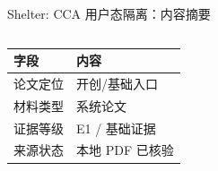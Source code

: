 \begin{frame}[t,shrink=6]{Shelter: CCA 用户态隔离：内容摘要}
\begin{columns}[T,totalwidth=\textwidth]
\begin{column}{0.49\textwidth}
{\begin{minipage}[t]{0.97\linewidth}
\begin{minipage}{0.92\linewidth}
      \scriptsize {\tiny
\begin{tabularx}{\linewidth}{@{}YY@{}}
\toprule
\textbf{字段} & \textbf{内容} \\
\midrule
论文定位 & 开创/基础入口 \\
材料类型 & 系统论文 \\
证据等级 & E1 / 基础证据 \\
来源状态 & 本地 PDF 已核验 \\
\bottomrule
\end{tabularx}
}
    \end{minipage}
    \vspace{1mm}
  \end{minipage}}
  \end{column}
\end{columns}
\end{frame}


